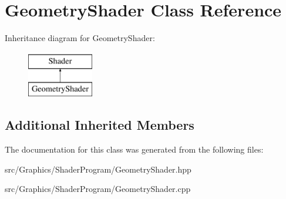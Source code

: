 \hypertarget{class_geometry_shader}{\section{Geometry\+Shader Class Reference}
\label{class_geometry_shader}
}
Inheritance diagram for Geometry\+Shader\+:\begin{figure}[H]
\begin{center}
\leavevmode
\includegraphics[height=2.000000cm]{class_geometry_shader}
\end{center}
\end{figure}
\subsection*{Additional Inherited Members}


The documentation for this class was generated from the following files\+:\begin{DoxyCompactItemize}
\item 
src/\+Graphics/\+Shader\+Program/Geometry\+Shader.\+hpp\item 
src/\+Graphics/\+Shader\+Program/Geometry\+Shader.\+cpp\end{DoxyCompactItemize}
